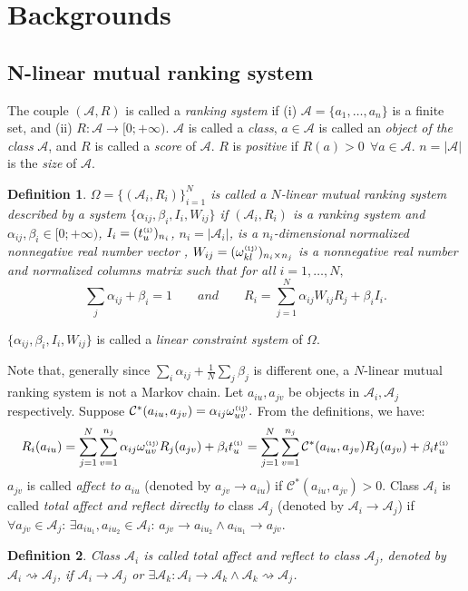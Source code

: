 \documentclass[10pt,leqno,twoside]{article}
\newtheorem{definition}{\indent Definition}[section]
\begin{document}
\section{Backgrounds}\label{Sect:Backgrounds}\label{Sect:Background}
\subsection{N-linear mutual ranking system}\label{Sect:N-linear}
The couple $(\mathcal{A},R)$ is called a \emph{ranking system} if (i) $\mathcal{A} = \{a_1,\ldots,a_n\}$ is a finite set, and (ii) $R: \mathcal{A} \rightarrow [0;+\infty)$. $\mathcal{A}$ is called a \emph{class}, $a\in\mathcal{A}$ is called an \emph{object of the class} $\mathcal{A}$, and $R$ is called a \emph{score} of $\mathcal{A}$. $R$ is \emph{positive} if $R(a)>0 ~~\forall a \in \mathcal{A}$. $n = |\mathcal{A}|$ is the \emph{size} of $\mathcal{A}$.
\setlength{\parskip}{3pt}
\begin{definition}
$\Omega = \{(\mathcal{A}_i,R_i)\}_{i=1}^N$ is called a \emph{$N$-linear mutual ranking system} described by a system $\{\alpha_{ij},\beta_i,I_i,W_{ij}\}$ if $(\mathcal{A}_i,R_i)$ is a ranking system and $\alpha_{ij}, \beta_i \in [0;+\infty)$, $I_i=(t^{\texttt{\tiny(i)}}_u)_{n_i}$, $n_i = |\mathcal{A}_i|$, is a $n_i$-dimensional normalized nonnegative real number vector , $W_{ij}=(\omega^{\texttt{\tiny(ij)}}_{kl})_{n_i \times n_j}$ is a nonnegative real number and normalized columns matrix such that for all $i = 1,\ldots,N,$
\[\sum_j\alpha_{ij}+ \beta_i=1\qquad and \qquad R_i = \sum^N_{j=1}\alpha_{ij}W_{ij}R_j + \beta_i I_i.\]
\end{definition}
$\{\alpha_{ij},\beta_i,I_i,W_{ij}\}$ is called a \emph{linear constraint system} of $\Omega$.

Note that, generally since $\sum_i\alpha_{ij} + \frac{1}{N}\sum_j{\beta_j}$ is different one, a $N$-linear mutual ranking system is not a Markov chain. Let $a_{iu}, a_{jv}$ be objects in $\mathcal{A}_i, \mathcal{A}_j$ respectively. Suppose $\mathcal{C}^*(a_{iu},a_{jv})=\alpha_{ij}\omega^{\texttt{\tiny(ij)}}_{uv}.$
From the definitions, we have:
\[ R_i(a_{iu}) = \sum^N_{j=1}\sum^{n_j}_{v=1}\alpha_{ij}\omega^{\texttt{\tiny(ij)}}_{uv}R_j(a_{jv}) + \beta_i t^{\texttt{\tiny(i)}}_u=\sum^N_{j=1}\sum^{n_j}_{v=1}\mathcal{C}^*(a_{iu},a_{jv})R_j(a_{jv}) + \beta_i t^{\texttt{\tiny(i)}}_u\]
$a_{jv}$ is called \emph{affect to}  $a_{iu}$ (denoted by $a_{jv}\rightarrow a_{iu}$) if $\mathcal{C}^*(a_{iu},a_{jv})>0$. Class $\mathcal{A}_i$ is called  \emph{total affect and reflect directly to} class $\mathcal{A}_j$ (denoted by $\mathcal{A}_i\rightarrow \mathcal{A}_j$) if $\forall a_{jv}\in\mathcal{A}_j$:  $\exists a_{iu_1}, a_{iu_2}\in\mathcal{A}_i$: $a_{jv}\rightarrow a_{iu_2} \wedge a_{iu_1}\rightarrow a_{jv}$.
\begin{definition}
Class $\mathcal{A}_i$ is called  \emph{total affect and reflect to} class $\mathcal{A}_j$, denoted by $\mathcal{A}_i \rightsquigarrow \mathcal{A}_j$, if $\mathcal{A}_i\rightarrow \mathcal{A}_j$ or $\exists \mathcal{A}_k: \mathcal{A}_i\rightarrow \mathcal{A}_k \wedge \mathcal{A}_k \rightsquigarrow \mathcal{A}_j$.
\end{definition}
\end{document}
